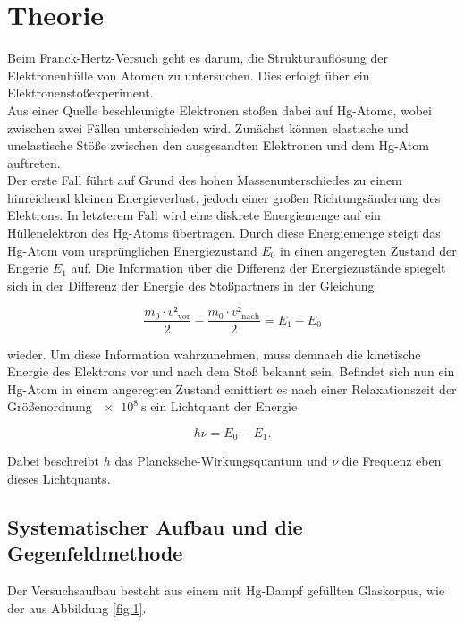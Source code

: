 \section{Theorie}
\label{sec:Theorie}

Beim Franck-Hertz-Versuch geht es darum, die Strukturauflösung der Elektronenhülle von Atomen zu untersuchen.
Dies erfolgt über ein Elektronenstoßexperiment.\\
Aus einer Quelle beschleunigte Elektronen stoßen dabei auf Hg-Atome, wobei zwischen zwei Fällen unterschieden wird.
Zunächst können elastische und unelastische Stöße zwischen den ausgesandten Elektronen und dem Hg-Atom auftreten.\\
Der erste Fall führt auf Grund des hohen Massenunterschiedes zu einem hinreichend kleinen Energieverlust, jedoch einer großen Richtungsänderung des Elektrons.
In letzterem Fall wird eine diskrete Energiemenge auf ein Hüllenelektron des Hg-Atoms übertragen.
Durch diese Energiemenge steigt das Hg-Atom vom ursprünglichen Energiezustand $E_0$ in einen angeregten Zustand der Engerie $E_1$ auf.
Die Information über die Differenz der Energiezustände spiegelt sich in der Differenz der Energie des Stoßpartners in der Gleichung

\begin{equation}
\frac{m_0 \cdot v²_{\text{vor}}}{2} - \frac{m_0 \cdot v²_{\text{nach}}}{2} = E_1 - E_0 \label{eqn:1}
\end{equation}

wieder.
Um diese Information wahrzunehmen, muss demnach die kinetische Energie des Elektrons vor und nach dem Stoß bekannt sein.
Befindet sich nun ein Hg-Atom in einem angeregten Zustand emittiert es nach einer Relaxationszeit der Größenordnung $\SI{e8}{\second}$ ein Lichtquant der Energie

\begin{equation}
  h\nu = E_0 - E_1. \label{eqn:2}
\end{equation}

Dabei beschreibt $h$ das Plancksche-Wirkungsquantum und $\nu$ die Frequenz eben dieses Lichtquants.

\subsection{Systematischer Aufbau und die Gegenfeldmethode}
Der Versuchsaufbau besteht aus einem mit Hg-Dampf gefüllten Glaskorpus, wie der aus Abbildung \ref{fig:1}.

